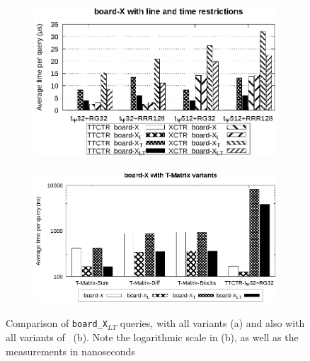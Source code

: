     \begin{figure}[ht]
    \begin{subfigure}{0.5\linewidth}
    \includegraphics[width=\linewidth]{experiments/board.eps}
    \vspace{-12pt}
    \caption{}
    \vspace{-12pt}
    \end{subfigure}%
    \begin{subfigure}{0.5\linewidth}
    \includegraphics[width=\linewidth]{experiments/board_t.eps}
    \vspace{-12pt}
    \caption{}
    \vspace{-12pt}
    \end{subfigure}
    \caption{Comparison of \texttt{board\_X$_{LT}$} queries, with all variants (a) and also with all variants of \acumm~(b). Note the logarithmic scale in (b), as well as the measurements in nanoseconds}
    \label{fig:board}
    \end{figure}
    
